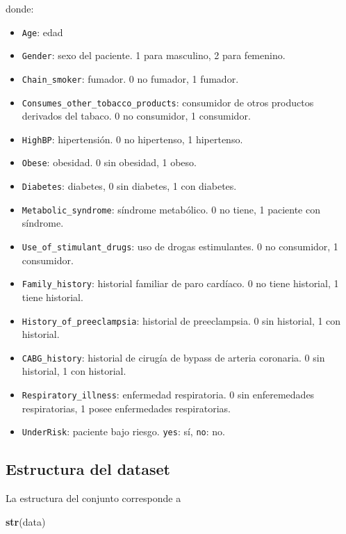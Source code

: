 \documentclass[
  spanish,
]{article}
\newenvironment{Shaded}{\begin{snugshade}}{\end{snugshade}}
\newcommand{\KeywordTok}[1]{\textcolor[rgb]{0.13,0.29,0.53}{\textbf{#1}}}
\newcommand{\NormalTok}[1]{#1}
\begin{document}
donde:

\begin{itemize}
    \item \texttt{Age}: edad
    \item \texttt{Gender}: sexo del paciente. 1 para masculino, 2 para femenino.
    \item \texttt{Chain\_smoker}: fumador. 0 no fumador, 1 fumador.
    \item \texttt{Consumes\_other\_tobacco\_products}: consumidor de otros productos derivados del tabaco. 0 no consumidor, 1 consumidor.
    \item \texttt{HighBP}: hipertensión. 0 no hipertenso, 1 hipertenso.
    \item \texttt{Obese}: obesidad. 0 sin obesidad, 1 obeso.
    \item \texttt{Diabetes}: diabetes, 0 sin diabetes, 1 con diabetes.
    \item \texttt{Metabolic\_syndrome}: síndrome metabólico. 0 no tiene, 1 paciente con síndrome.
    \item \texttt{Use\_of\_stimulant\_drugs}: uso de drogas estimulantes. 0 no consumidor, 1 consumidor.
    \item \texttt{Family\_history}: historial familiar de paro cardíaco. 0 no tiene historial, 1 tiene historial.
    \item \texttt{History\_of\_preeclampsia}: historial de preeclampsia. 0 sin historial, 1 con historial.
    \item \texttt{CABG\_history}: historial de cirugía de bypass de arteria coronaria. 0 sin historial, 1 con historial.
    \item \texttt{Respiratory\_illness}: enfermedad respiratoria. 0 sin enferemedades respiratorias, 1 posee enfermedades respiratorias.
    \item \texttt{UnderRisk}: paciente bajo riesgo. \texttt{yes}: sí, \texttt{no}: no.
\end{itemize}

\hypertarget{estructura-del-dataset}{%
\subsection{Estructura del dataset}\label{estructura-del-dataset}}

La estructura del conjunto corresponde a

\begin{Shaded}
\begin{Highlighting}[]
\KeywordTok{str}\NormalTok{(data)}
\end{Highlighting}
\end{Shaded}
\end{document}
